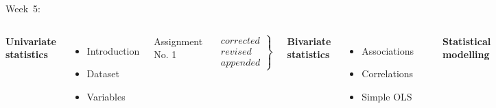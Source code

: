 \documentclass[t]{beamer}
\begin{document}
    \begin{frame}[t]{Week~5: }
    
	    \begin{columns}[T]
	    \textbf{Univariate\\statistics}
    
	    \vspace{.55em}
	    \begin{itemize}
	        \item Introduction
	        \item Dataset
	        \item Variables
	    \end{itemize}

	    Assignment No. 1
    
	    $$
	    \left.
	        \begin{array}{rrr}
	            corrected \\
	            revised\\
	            appended
	        \end{array}
	    \right \}
	    $$
    
	    \textbf{Bivariate\\statistics}
    
	    \begin{itemize}
	        \item Associations
	        \item Correlations
	        \item Simple OLS
	    \end{itemize}
	    \\[.5em]
    
    
	    \textbf{Statistical\\modelling}
    
	    \begin{itemize}
	        \item Regressions
	        \item Diagnostics
	        \item Conclusion
	    \end{itemize}
	    Final paper\\[.5em]
	    \end{columns}
    
    \end{frame}
\end{document}
